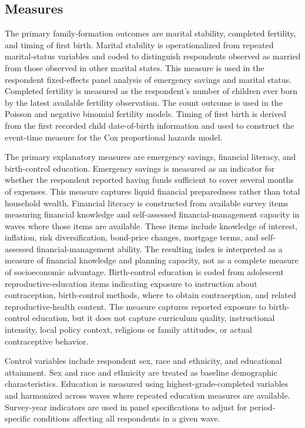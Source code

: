 \documentclass[12pt]{article}
\begin{document}
\subsection{Measures}

The primary family-formation outcomes are marital stability, completed fertility, and timing of first birth. Marital stability is operationalized from repeated marital-status variables and coded to distinguish respondents observed as married from those observed in other marital states. This measure is used in the respondent fixed-effects panel analysis of emergency savings and marital status. Completed fertility is measured as the respondent's number of children ever born by the latest available fertility observation. The count outcome is used in the Poisson and negative binomial fertility models. Timing of first birth is derived from the first recorded child date-of-birth information and used to construct the event-time measure for the Cox proportional hazards model.

The primary explanatory measures are emergency savings, financial literacy, and birth-control education. Emergency savings is measured as an indicator for whether the respondent reported having funds sufficient to cover several months of expenses. This measure captures liquid financial preparedness rather than total household wealth. Financial literacy is constructed from available survey items measuring financial knowledge and self-assessed financial-management capacity in waves where those items are available. These items include knowledge of interest, inflation, risk diversification, bond-price changes, mortgage terms, and self-assessed financial-management ability. The resulting index is interpreted as a measure of financial knowledge and planning capacity, not as a complete measure of socioeconomic advantage. Birth-control education is coded from adolescent reproductive-education items indicating exposure to instruction about contraception, birth-control methods, where to obtain contraception, and related reproductive-health content. The measure captures reported exposure to birth-control education, but it does not capture curriculum quality, instructional intensity, local policy context, religious or family attitudes, or actual contraceptive behavior.

Control variables include respondent sex, race and ethnicity, and educational attainment. Sex and race and ethnicity are treated as baseline demographic characteristics. Education is measured using highest-grade-completed variables and harmonized across waves where repeated education measures are available. Survey-year indicators are used in panel specifications to adjust for period-specific conditions affecting all respondents in a given wave.
\end{document}
